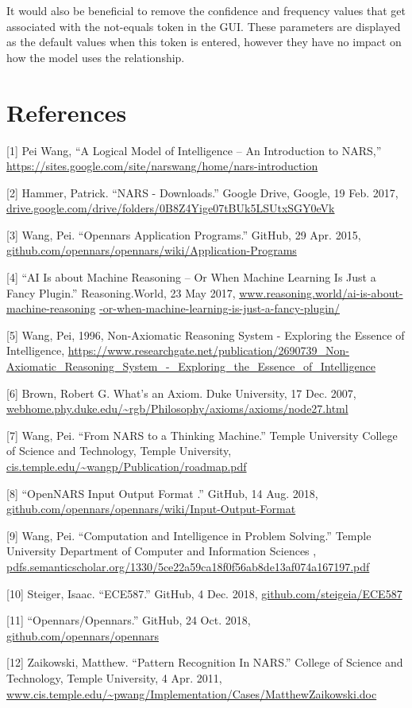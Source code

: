 \documentclass[conference]{IEEEtran}
\begin{document}
	It would also be beneficial to remove the confidence and frequency values that get associated with the not-equals token in the GUI. These parameters are displayed as the default values when this token is entered, however they have no impact on how the model uses the relationship.

\section{References}
[1] Pei Wang, “A Logical Model of Intelligence – An Introduction to NARS,” \url{https://sites.google.com/site/narswang/home/nars-introduction}

[2] Hammer, Patrick. “NARS - Downloads.” Google Drive, Google, 19 Feb. 2017, \url{drive.google.com/drive/folders/0B8Z4Yige07tBUk5LSUtxSGY0eVk}

[3] Wang, Pei. “Opennars Application Programs.” GitHub, 29 Apr. 2015, \url{github.com/opennars/opennars/wiki/Application-Programs}

[4] “AI Is about Machine Reasoning – Or When Machine Learning Is Just a Fancy Plugin.” Reasoning.World, 23 May 2017, \url{www.reasoning.world/ai-is-about-machine-reasoning}
\url{-or-when-machine-learning-is-just-a-fancy-plugin/}

[5] Wang, Pei, 1996, Non-Axiomatic Reasoning System - Exploring the Essence of Intelligence, \url{https://www.researchgate.net/publication/2690739_Non-Axiomatic_Reasoning_System_-_Exploring_the_Essence_of_Intelligence}

[6] Brown, Robert G. What's an Axiom. Duke University, 17 Dec. 2007, \url{webhome.phy.duke.edu/~rgb/Philosophy/axioms/axioms/node27.html}

[7] Wang, Pei. “From NARS to a Thinking Machine.” Temple University College of Science and Technology, Temple University, \url{cis.temple.edu/~wangp/Publication/roadmap.pdf}

[8] “OpenNARS Input Output Format .” GitHub, 14 Aug. 2018, \url{github.com/opennars/opennars/wiki/Input-Output-Format}

[9] Wang, Pei. “Computation and Intelligence in Problem Solving.” Temple University Department of Computer and Information Sciences , \url{pdfs.semanticscholar.org/1330/5ce22a59ca18f0f56ab8de13af074a167197.pdf}

[10] Steiger, Isaac. “ECE587.” GitHub, 4 Dec. 2018, \url{github.com/steigeia/ECE587}

[11] “Opennars/Opennars.” GitHub, 24 Oct. 2018, \url{github.com/opennars/opennars}

[12] Zaikowski, Matthew. “Pattern Recognition In NARS.” College of Science and Technology, Temple University, 4 Apr. 2011, \url{www.cis.temple.edu/~pwang/Implementation/Cases/MatthewZaikowski.doc}
\end{document}
